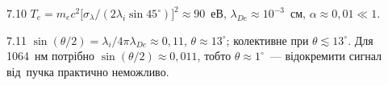 \begin{Solution}{7.{10}}
		$T_e=m_ec^2\bigl[\sigma_\lambda/(2\lambda_i\sin45^\circ)\bigr]^2\approx90$~еВ,
$\lambda_{De}\approx10^{-3}$~см, $\alpha\approx0{,}01\ll1$.
	
\end{Solution}
\begin{Solution}{7.{11}}
		$\sin(\theta/2)=\lambda_i/4\pi\lambda_{De}\approx0{,}11$, $\theta\approx13^\circ$; колективне при $\theta\lesssim13^\circ$.
Для 1064~нм потрібно $\sin(\theta/2)\approx0{,}011$, тобто $\theta\approx1^\circ$~--- відокремити сигнал від~пучка практично неможливо.
	
\end{Solution}
